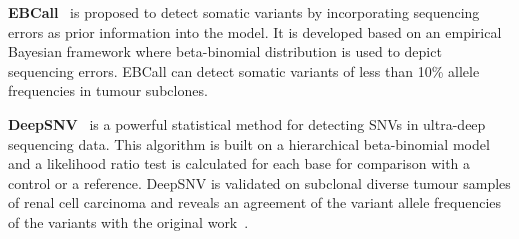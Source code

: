\documentclass[a4,center,fleqn]{NAR}
\begin{document}
\textbf{EBCall}~\citep{Shiraishi2013} is proposed to detect somatic variants by incorporating sequencing errors as prior information into the model.
It is developed based on an empirical Bayesian framework where beta-binomial distribution is used to depict sequencing errors.
EBCall can detect somatic variants of less than 10\% allele frequencies in tumour subclones.

\textbf{DeepSNV}~\citep{gerstung2012reliable} is a powerful statistical method for detecting SNVs in ultra-deep sequencing data.
This algorithm is built on a hierarchical beta-binomial model and a likelihood ratio test is calculated for each base for comparison with a control or a reference.
DeepSNV is validated on subclonal diverse tumour samples of renal cell carcinoma and reveals an agreement of the variant allele frequencies of the variants with the original work~\citep{gerstung2012reliable}.
\end{document}
